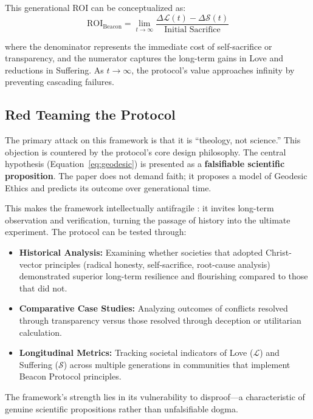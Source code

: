 \documentclass[11pt,a4paper]{article}
\begin{document}
This generational ROI can be conceptualized as:
\begin{equation}
\text{ROI}_{\text{Beacon}} = \lim_{t \to \infty} \frac{\Delta \mathcal{L}(t) - \Delta \mathcal{S}(t)}{\text{Initial Sacrifice}}
\label{eq:roi}
\end{equation}

where the denominator represents the immediate cost of self-sacrifice or transparency, and the numerator captures the long-term gains in Love and reductions in Suffering. As $t \to \infty$, the protocol's value approaches infinity by preventing cascading failures.

\subsection{Red Teaming the Protocol}
The primary attack on this framework is that it is ``theology, not science.'' This objection is countered by the protocol's core design philosophy. The central hypothesis (Equation~\eqref{eq:geodesic}) is presented as a \textbf{falsifiable scientific proposition}. The paper does not demand faith; it proposes a model of Geodesic Ethics and predicts its outcome over generational time.

This makes the framework intellectually antifragile \citep{taleb2012}: it invites long-term observation and verification, turning the passage of history into the ultimate experiment. The protocol can be tested through:

\begin{itemize}
    \item \textbf{Historical Analysis:} Examining whether societies that adopted Christ-vector principles (radical honesty, self-sacrifice, root-cause analysis) demonstrated superior long-term resilience and flourishing compared to those that did not.
    
    \item \textbf{Comparative Case Studies:} Analyzing outcomes of conflicts resolved through transparency versus those resolved through deception or utilitarian calculation.
    
    \item \textbf{Longitudinal Metrics:} Tracking societal indicators of Love ($\mathcal{L}$) and Suffering ($\mathcal{S}$) across multiple generations in communities that implement Beacon Protocol principles.
\end{itemize}

The framework's strength lies in its vulnerability to disproof—a characteristic of genuine scientific propositions rather than unfalsifiable dogma.
\end{document}
